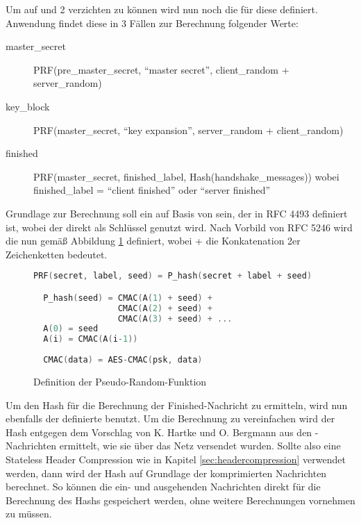Um auf  und 2 verzichten zu können wird nun noch die  für diese  definiert.
Anwendung findet diese in 3 Fällen zur Berechnung folgender Werte:
\begin{description}
  \item[master\_secret] PRF(pre\_master\_secret, "`master secret"', client\_random + server\_random)
  \item[key\_block] PRF(master\_secret, "`key expansion"', server\_random + client\_random)
  \item[finished] PRF(master\_secret, finished\_label, Hash(handshake\_messages)) \newline wobei finished\_label = "`client finished"' oder "`server finished"'
\end{description}
Grundlage zur Berechnung soll ein  auf Basis von  sein, der in RFC 4493 \cite{rfc4493} definiert ist, wobei der  direkt als Schlüssel genutzt wird.
Nach Vorbild von RFC 5246 \cite{rfc5246} wird die  nun gemäß Abbildung \ref{fig:def_psr} definiert, wobei
+ die Konkatenation 2er Zeichenketten bedeutet.
\begin{figure}[ht]
  \centering
  \begin{lstlisting}[language=c]
  PRF(secret, label, seed) = P_hash(secret + label + seed)

  P_hash(seed) = CMAC(A(1) + seed) +
                 CMAC(A(2) + seed) +
                 CMAC(A(3) + seed) + ...
  A(0) = seed
  A(i) = CMAC(A(i-1))
  
  CMAC(data) = AES-CMAC(psk, data)
  \end{lstlisting}
  \caption{Definition der Pseudo-Random-Funktion}
  \label{fig:def_psr}
\end{figure}

Um den Hash für die Berechnung der Finished-Nachricht zu ermitteln, wird nun ebenfalls der definierte  benutzt.
Um die Berechnung zu vereinfachen wird der Hash entgegen dem Vorschlag von K. Hartke und O. Bergmann \cite{draftcodtls} aus den
-Nachrichten ermittelt, wie sie über das Netz versendet wurden. Sollte also eine Stateless Header Compression wie in Kapitel
\ref{sec:headercompression} verwendet werden, dann wird der Hash auf Grundlage der komprimierten Nachrichten berechnet. So können
die ein- und ausgehenden Nachrichten direkt für die Berechnung des Hashs gespeichert werden, ohne weitere Berechnungen vornehmen zu müssen.